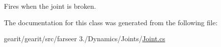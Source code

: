 Fires when the joint is broken. 



The documentation for this class was generated from the following file\+:\begin{DoxyCompactItemize}
\item 
gearit/gearit/src/farseer 3./\+Dynamics/\+Joints/\hyperlink{_joint_8cs}{Joint.\+cs}\end{DoxyCompactItemize}
